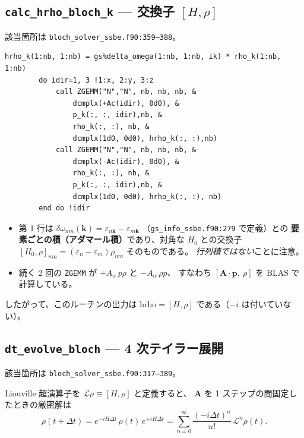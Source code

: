 \documentclass[dvipdfmx,a4paper,11pt]{jsarticle}
\newcommand{\file}[1]{\texttt{#1}}
\newcommand{\vk}{\bm{k}}
\newcommand{\vA}{\bm{A}}
\newcommand{\vp}{\bm{p}}
\newcommand{\eps}{\varepsilon}
\newcommand{\dt}{\Delta t}
\begin{document}
\subsection{\texttt{calc\_hrho\_bloch\_k} --- 交換子 $[H,\rho]$}

該当箇所は \file{bloch\_solver\_ssbe.f90:359--388}。

\begin{lstlisting}[firstnumber=367,caption={対角部分（アダマール積）と非対角部分（ZGEMM）}]
        hrho_k(1:nb, 1:nb) = gs%delta_omega(1:nb, 1:nb, ik) * rho_k(1:nb, 1:nb)
        do idir=1, 3 !1:x, 2:y, 3:z
            call ZGEMM("N","N", nb, nb, nb, &
                dcmplx(+Ac(idir), 0d0), &
                p_k(:, :, idir),nb, &
                rho_k(:, :), nb, &
                dcmplx(1d0, 0d0), hrho_k(:, :),nb)
            call ZGEMM("N","N", nb, nb, nb, &
                dcmplx(-Ac(idir), 0d0), &
                rho_k(:, :), nb, &
                p_k(:, :, idir),nb, &
                dcmplx(1d0, 0d0), hrho_k(:, :), nb)
        end do !idir
\end{lstlisting}

\begin{itemize}
\item 第 1 行は $\delta\omega_{nm}(\vk) = \eps_{n\vk} - \eps_{m\vk}$
      （\file{gs\_info\_ssbe.f90:279} で定義）との
      \textbf{要素ごとの積（アダマール積）}であり、対角な $H_0$ との交換子
      $[H_0,\rho]_{nm} = (\eps_n - \eps_m)\rho_{nm}$ そのものである。
      \emph{行列積ではない}ことに注意。
\item 続く 2 回の \verb|ZGEMM| が $+A_\alpha\, p\rho$ と $-A_\alpha\, \rho p$、
      すなわち $[\vA\cdot\vp,\ \rho]$ を BLAS で計算している。
\end{itemize}

したがって、このルーチンの出力は $\mathrm{hrho} = [H,\rho]$ である（$-i$ は付いていない）。

\subsection{\texttt{dt\_evolve\_bloch} --- 4 次テイラー展開}
\label{sec:evolve}

該当箇所は \file{bloch\_solver\_ssbe.f90:317--389}。

Liouville 超演算子を $\mathcal{L}\rho \equiv [H,\rho]$ と定義すると、
$\vA$ を 1 ステップの間固定したときの厳密解は
%
\begin{equation}
  \rho(t+\dt) = e^{-iH\dt}\,\rho(t)\,e^{+iH\dt}
  = \sum_{n=0}^{\infty} \frac{(-i\dt)^n}{n!}\,\mathcal{L}^n \rho(t).
  \label{eq:taylor}
\end{equation}
\end{document}
